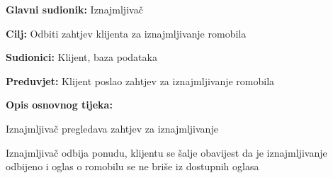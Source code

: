 						\noindent {}
						\begin{packed_item}
							
							\item \textbf{Glavni sudionik: }Iznajmljivač
							\item  \textbf{Cilj: }Odbiti zahtjev klijenta za iznajmljivanje romobila
							\item  \textbf{Sudionici: }Klijent, baza podataka
							\item  \textbf{Preduvjet: }Klijent poslao zahtjev za iznajmljivanje romobila
							\item  \textbf{Opis osnovnog tijeka:}
							
							\item[] \begin{packed_enum}
								
								\item Iznajmljivač pregledava zahtjev za iznajmljivanje 
								\item Iznajmljivač odbija ponudu, klijentu se šalje obavijest da je iznajmljivanje odbijeno i oglas o romobilu se ne briše iz dostupnih oglasa   
							\end{packed_enum}
							
							
						\end{packed_item}
						\noindent {}
